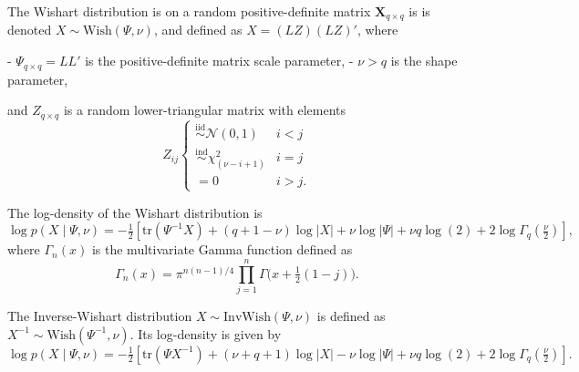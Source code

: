 The Wishart distribution is on a random positive-definite matrix $\bm{X}_{q\times q}$ is is denoted $X \sim \mathrm{Wish}(\Psi, \nu)$, and defined as $X = (L Z)(L Z)'$, where 

- $\Psi_{q\times q} = LL'$ is the positive-definite matrix scale parameter,
- $\nu > q$ is the shape parameter, 

and $Z_{q\times q}$ is a random lower-triangular matrix with elements
\[
  Z_{ij}
  \begin{cases} 
    \stackrel{\mathrm{iid}}{\sim} \mathcal N(0,1) & i < j \\ 
    \stackrel{\mathrm{ind}}{\sim} \chi^2_{(\nu-i+1)} & i = j \\
    = 0 & i > j.
  \end{cases}
\]

The log-density of the Wishart distribution is
\[
\log p(X \mid \Psi, \nu) = -\tfrac{1}{2} \left[\mathrm{tr}(\Psi^{-1} X) + (q+1-\nu)\log |X| + \nu \log |\Psi|  + \nu q \log(2) + 2 \log \Gamma_q(\tfrac \nu 2)\right],
\]
where  $\Gamma_n(x)$ is the multivariate Gamma function defined as
\[
\Gamma_n(x) = \pi^{n(n-1)/4} \prod_{j=1}^n \Gamma\big(x + \tfrac 1 2 (1-j)\big).
\]

The Inverse-Wishart distribution $X \sim \mathrm{InvWish}(\Psi, \nu)$ is defined as $X^{-1} \sim \mathrm{Wish}(\Psi^{-1}, \nu)$.  Its log-density is given by
\[
\log p(X \mid \Psi, \nu) = -\tfrac 1 2 \left[\mathrm{tr}(\Psi X^{-1}) + (\nu+q+1) \log |X| - \nu \log |\Psi| + \nu q \log(2) + 2 \log \Gamma_q(\tfrac \nu 2)\right].
\]
